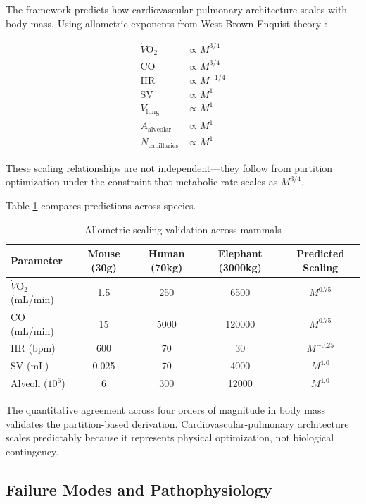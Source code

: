 The framework predicts how cardiovascular-pulmonary architecture scales with body mass. Using allometric exponents from West-Brown-Enquist theory \cite{west1997general}:

\begin{align}
\dot{V}\mathrm{O}_{2} &\propto M^{3/4} \\
\mathrm{CO} &\propto M^{3/4} \\
\mathrm{HR} &\propto M^{-1/4} \\
\mathrm{SV} &\propto M^{1} \\
V_{\mathrm{lung}} &\propto M^{1} \\
A_{\mathrm{alveolar}} &\propto M^{1} \\
N_{\mathrm{capillaries}} &\propto M^{1}
\end{align}

These scaling relationships are not independent—they follow from partition optimization under the constraint that metabolic rate scales as $M^{3/4}$.

Table \ref{tab:allometric_validation} compares predictions across species.

\begin{table}[h]
\centering
\caption{Allometric scaling validation across mammals}
\label{tab:allometric_validation}
\begin{tabular}{lcccc}
\toprule
\textbf{Parameter} & \textbf{Mouse (30g)} & \textbf{Human (70kg)} & \textbf{Elephant (3000kg)} & \textbf{Predicted Scaling} \\
\midrule
$\dot{V}\mathrm{O}_{2}$ (mL/min) & 1.5 & 250 & 6500 & $M^{0.75}$ \\
CO (mL/min) & 15 & 5000 & 120000 & $M^{0.75}$ \\
HR (bpm) & 600 & 70 & 30 & $M^{-0.25}$ \\
SV (mL) & 0.025 & 70 & 4000 & $M^{1.0}$ \\
Alveoli ($10^{6}$) & 6 & 300 & 12000 & $M^{1.0}$ \\
\bottomrule
\end{tabular}
\end{table}

The quantitative agreement across four orders of magnitude in body mass validates the partition-based derivation. Cardiovascular-pulmonary architecture scales predictably because it represents physical optimization, not biological contingency.

\subsection{Failure Modes and Pathophysiology}

